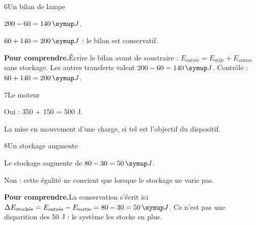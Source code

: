 \par\noindent\begin{minipage}{\linewidth}
\begin{corrige}{6}{Un bilan de lampe}
\begin{questions}
\item $200-60=140\unite J$.
\item $60+140=200\unite J$ : le bilan est conservatif.
\end{questions}
\par\smallskip\noindent\textbf{Pour comprendre.}\enspace Écrire le bilan avant de soustraire : $E_{\text{entrée}}=E_{\text{utile}}+E_{\text{autres}}$ sans stockage. Les autres transferts valent $200-60=140\unite J$. Contrôle : $60+140=200\unite J$.\par
{}
\end{corrige}
\end{minipage}
\par\noindent\begin{minipage}{\linewidth}
\begin{corrige}{7}{Le moteur}
\begin{questions}
\item Oui : 350 + 150 = 500 J.
\item La mise en mouvement d’une charge, si tel est l’objectif du dispositif.
\end{questions}
\end{corrige}
\end{minipage}
\par\noindent\begin{minipage}{\linewidth}
\begin{corrige}{8}{Un stockage augmente}
\begin{questions}
\item Le stockage augmente de $80-30=50\unite J$.
\item Non : cette égalité ne convient que lorsque le stockage ne varie pas.
\end{questions}
\par\smallskip\noindent\textbf{Pour comprendre.}\enspace La conservation s’écrit ici $\Delta E_{\text{stockée}}=E_{\text{entrée}}-E_{\text{sortie}}=80-30=50\unite J$. Ce n’est pas une disparition des 50 J : le système les stocke en plus.\par
{}
\end{corrige}
\end{minipage}

